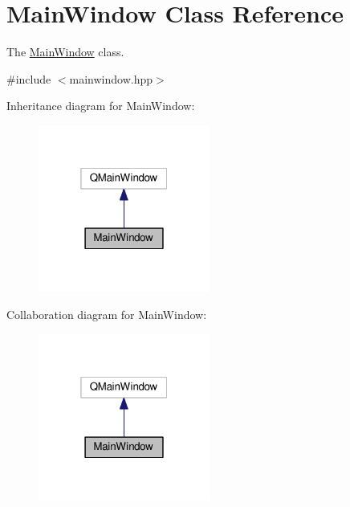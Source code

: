 \hypertarget{classMainWindow}{}\section{Main\+Window Class Reference}
\label{classMainWindow}


The \hyperlink{classMainWindow}{Main\+Window} class.  




{\ttfamily \#include $<$mainwindow.\+hpp$>$}



Inheritance diagram for Main\+Window\+:
\nopagebreak
\begin{figure}[H]
\begin{center}
\leavevmode
\includegraphics[width=160pt]{classMainWindow__inherit__graph}
\end{center}
\end{figure}


Collaboration diagram for Main\+Window\+:
\nopagebreak
\begin{figure}[H]
\begin{center}
\leavevmode
\includegraphics[width=160pt]{classMainWindow__coll__graph}
\end{center}
\end{figure}
